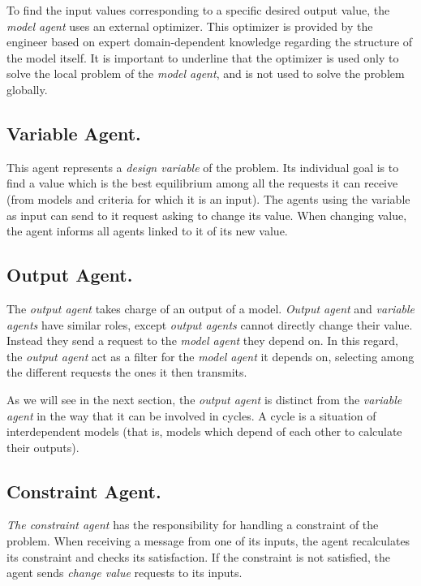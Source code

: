 To find the input values corresponding to a specific desired output value, the \emph{model agent} uses an external optimizer. This optimizer is provided by the engineer based on expert domain-dependent knowledge regarding the structure of the model itself.
It is important to underline that the optimizer is used only to solve the local problem of the \emph{model agent}, and is  not used to solve the problem globally.

\subsection{Variable Agent.}

This agent represents a \emph{design variable} of the problem. Its individual goal is to find a value which is the best equilibrium among all the requests it can receive (from models and criteria for which it is an input). The agents using the variable as input can send to it request asking to change its value. When changing value, the agent informs all agents linked to it of its new value. 

\subsection{Output Agent.}
The \emph{output agent} takes charge of an output of a model. \emph{Output agent} and \emph{variable agents} have similar roles, except \emph{output agents} cannot directly change their value. Instead they send a request to the \emph{model agent} they depend on. In this regard, the \emph{output agent} act as a filter for the \emph{model agent} it depends on, selecting among the different requests the ones it then transmits.

As we will see in the next section, the \emph{output agent} is distinct from the \emph{variable agent} in the way that it can be involved in cycles. A cycle is a situation of interdependent models (that is, models which depend of each other to calculate their outputs).

\subsection{Constraint Agent.}
 \emph{The constraint agent} has the responsibility for handling a constraint of the problem. When receiving a message from one of its inputs, the agent recalculates its constraint and checks its satisfaction. If the constraint is not satisfied, the agent sends \emph{change value} requests to its inputs.

